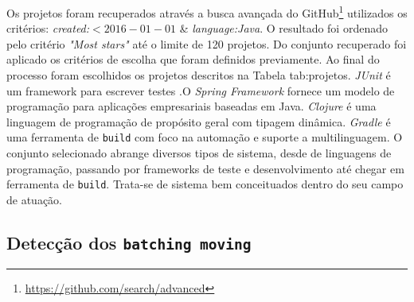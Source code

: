\documentclass[12pt]{article}
\begin{document}
Os projetos foram recuperados através a busca avançada do GitHub\footnote{\url{https://github.com/search/advanced}} utilizados os critérios:  \textsl{created:}$<2016-01-01$ \& \textsl{language:Java}. O resultado foi ordenado pelo critério \textsl{"Most stars"} até o limite de 120 projetos. Do conjunto recuperado foi aplicado os critérios de escolha que foram definidos previamente. Ao final do processo foram escolhidos os projetos descritos na Tabela tab:projetos. \textsl{JUnit} é um framework para escrever testes .O \textsl{Spring Framework} fornece um modelo de programação para aplicações empresariais baseadas em Java. \textsl{Clojure} é uma linguagem de programação de propósito geral com tipagem dinâmica. \textsl{Gradle} é uma ferramenta de \texttt{build} com foco na automação e suporte a multilinguagem. O conjunto selecionado abrange diversos tipos de sistema, desde de linguagens de programação, passando por frameworks de teste e desenvolvimento até chegar em ferramenta de \texttt{build}.  Trata-se de sistema bem conceituados dentro do seu campo de atuação.

\begin{table}[htb]
	\centering
	\caption{Projetos Analisados. Os dados apresentados tem como referência 22/06/2016.}
	\label{tab:projetos}
\end{table}


\subsection{Detecção dos \texttt{batching moving}}
\label{subsec:deteccao_refatoracoes}
\end{document}
